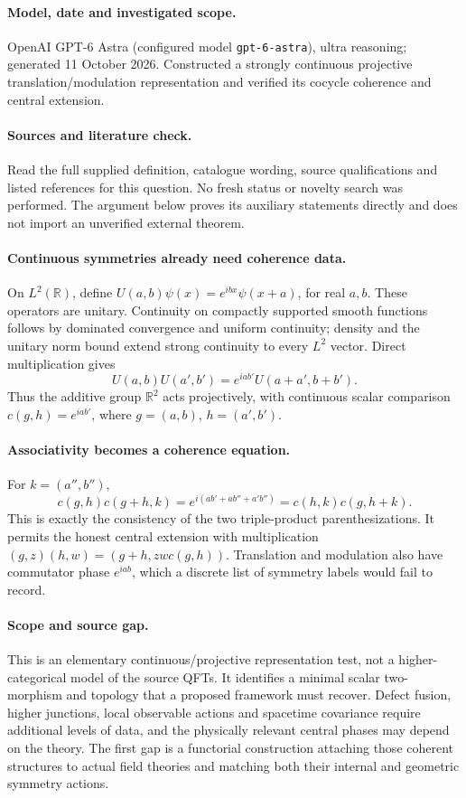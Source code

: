 \documentclass[11pt]{article}
\begin{document}
\paragraph{Model, date and investigated scope.}
OpenAI GPT-6 Astra (configured model \texttt{gpt-6-astra}), ultra reasoning; generated 11 October 2026. Constructed a strongly continuous projective translation/modulation representation and verified its cocycle coherence and central extension.

\paragraph{Sources and literature check.}
Read the full supplied definition, catalogue wording, source qualifications and listed references for this question. No fresh status or novelty search was performed. The argument below proves its auxiliary statements directly and does not import an unverified external theorem.

\paragraph{Continuous symmetries already need coherence data.} On \(L^2(\mathbb R)\), define \(U(a,b)\psi(x)=e^{ibx}\psi(x+a)\), for real \(a,b\). These operators are unitary. Continuity on compactly supported smooth functions follows by dominated convergence and uniform continuity; density and the unitary norm bound extend strong continuity to every \(L^2\) vector. Direct multiplication gives
\[
 U(a,b)U(a',b')=e^{iab'}U(a+a',b+b').
\]
Thus the additive group \(\mathbb R^2\) acts projectively, with continuous scalar comparison \(c(g,h)=e^{iab'}\), where \(g=(a,b)\), \(h=(a',b')\).
\paragraph{Associativity becomes a coherence equation.} For \(k=(a'',b'')\),
\[
 c(g,h)c(g+h,k)
 =e^{i(ab'+ab''+a'b'')}
 =c(h,k)c(g,h+k).
\]
This is exactly the consistency of the two triple-product parenthesizations. It permits the honest central extension with multiplication \((g,z)(h,w)=(g+h,zwc(g,h))\). Translation and modulation also have commutator phase \(e^{iab}\), which a discrete list of symmetry labels would fail to record.
\paragraph{Scope and source gap.} This is an elementary continuous/projective representation test, not a higher-categorical model of the source QFTs. It identifies a minimal scalar two-morphism and topology that a proposed framework must recover. Defect fusion, higher junctions, local observable actions and spacetime covariance require additional levels of data, and the physically relevant central phases may depend on the theory. The first gap is a functorial construction attaching those coherent structures to actual field theories and matching both their internal and geometric symmetry actions.
\end{document}
